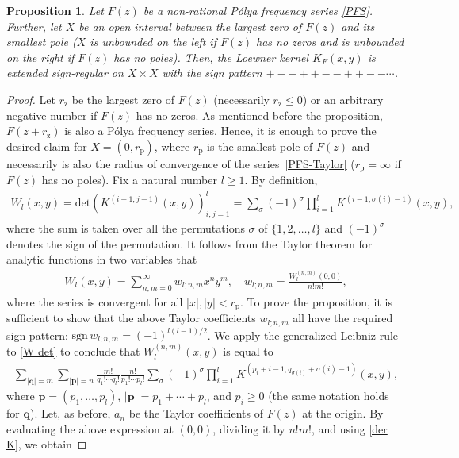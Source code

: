 \documentclass[twoside,a4paper]{amsart}
\newcommand{\sgn}{\mathrm{sgn}}
\renewcommand{\det}{\mathrm{det}}
\newtheorem{proposition}[theorem]{Proposition}
\theoremstyle{remark}
\begin{document}
\begin{proposition}
\label{prop:esr}
Let \( F(z) \) be a non-rational P\'olya frequency series \eqref{PFS}. Further, let \( X \) be an open interval between the largest zero of \( F(z) \) and its smallest pole (\( X \) is unbounded on the left if \( F(z) \) has no zeros and is unbounded on the right if \( F(z) \) has no poles). Then, the Loewner kernel \( K_F(x,y) \) is extended sign-regular on \( X\times X \) with the sign pattern \( +--++--++--\cdots\). 
\end{proposition}
\begin{proof}
Let \( r_{\mathrm z} \) be the largest zero of \( F(z) \) (necessarily \( r_{\mathrm z}\leq0 \)) or an arbitrary negative number if \( F(z) \) has no zeros. As mentioned before the proposition, \( F(z+r_{\mathrm z})\) is also a P\'olya frequency series. Hence, it is enough to prove the desired claim for \( X=(0,r_{\mathrm p})\), where \( r_{\mathrm p} \) is the smallest pole of \( F(z) \) and necessarily is also the radius of convergence of the series~\eqref{PFS-Taylor} (\( r_{\mathrm p}=\infty \) if \( F(z)\) has no poles). Fix a natural number \( l\geq 1 \). By definition, 
\begin{align}
\label{W det}
W_l(x,y) = \det\left( K^{(i-1,j-1)}(x,y)\right)_{i,j=1}^l = \sum_\sigma (-1)^\sigma \prod_{i=1}^l K^{(i-1,\sigma(i)-1)}(x,y),
\end{align}
where the sum is taken over all the permutations \( \sigma \) of \( \{1,2,\ldots,l\} \) and \( (-1)^\sigma \) denotes the sign of the permutation. It follows from the Taylor theorem for analytic functions in two variables that 
\begin{align}
\label{W Taylor}
W_l(x,y) = \sum_{n,m=0}^\infty w_{l;n,m}x^ny^m, \quad w_{l;n,m} = \frac{W_l^{(n,m)}(0,0)}{n!m!},
\end{align}
where the series is convergent for all \( |x|,|y|<r_{\mathrm p} \). To prove the proposition, it is sufficient to show that the above Taylor coefficients \( w_{l;n,m} \) all have the required sign pattern: $\sgn \,w_{l;n,m}=(-1)^{l(l-1)/2}$. We apply the generalized Leibniz rule to \eqref{W det} to conclude  that \( W_l^{(n,m)}(x,y) \) is equal to
\begin{align}
\sum_{|\boldsymbol q|=m}\sum_{|\boldsymbol p|=n}\frac{m!}{q_1!\cdots q_l!}\frac{n!}{p_1!\cdots p_l!}\sum_\sigma (-1)^\sigma \prod_{i=1}^l K^{(p_i+i-1, q_{\sigma(i)} + \sigma(i) -1)}(x,y),
\end{align}
where \( \boldsymbol p=(p_1,\ldots,p_l) \), \( |\boldsymbol p|=p_1 + \cdots + p_l\), and \( p_i\geq 0 \) (the same notation holds for \( \boldsymbol q\)). Let, as before, \( a_n \) be the Taylor coefficients of \( F(z) \) at the origin. By evaluating the above expression at \( (0,0) \), dividing it by \( n!m! \), and using \eqref{der K}, we obtain

\end{proof}
\end{document}
